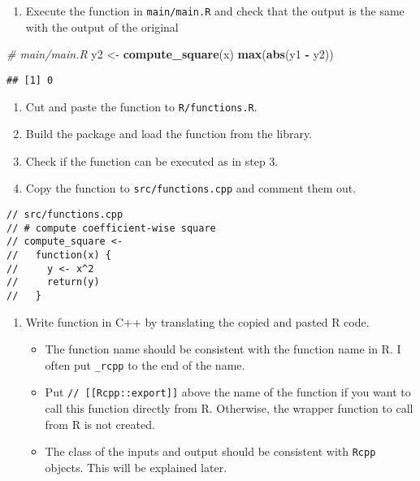\documentclass[
]{book}
\newenvironment{Shaded}{\begin{snugshade}}{\end{snugshade}}
\newcommand{\CommentTok}[1]{\textcolor[rgb]{0.56,0.35,0.01}{\textit{#1}}}
\newcommand{\KeywordTok}[1]{\textcolor[rgb]{0.13,0.29,0.53}{\textbf{#1}}}
\newcommand{\NormalTok}[1]{#1}
\newcommand{\OperatorTok}[1]{\textcolor[rgb]{0.81,0.36,0.00}{\textbf{#1}}}
\newcommand{\StringTok}[1]{\textcolor[rgb]{0.31,0.60,0.02}{#1}}
\providecommand{\tightlist}{%
  \setlength{\itemsep}{0pt}\setlength{\parskip}{0pt}}
\begin{document}
\begin{enumerate}
\def\labelenumi{\arabic{enumi}.}
\setcounter{enumi}{2}
\tightlist
\item
  Execute the function in \texttt{main/main.R} and check that the output is the same with the output of the original
\end{enumerate}

\begin{Shaded}
\begin{Highlighting}[]
\CommentTok{# main/main.R}
\NormalTok{y2 <-}\StringTok{ }\KeywordTok{compute_square}\NormalTok{(x)}
\KeywordTok{max}\NormalTok{(}\KeywordTok{abs}\NormalTok{(y1 }\OperatorTok{-}\StringTok{ }\NormalTok{y2))}
\end{Highlighting}
\end{Shaded}

\begin{verbatim}
## [1] 0
\end{verbatim}

\begin{enumerate}
\def\labelenumi{\arabic{enumi}.}
\setcounter{enumi}{3}
\tightlist
\item
  Cut and paste the function to \texttt{R/functions.R}.
\item
  Build the package and load the function from the library.
\item
  Check if the function can be executed as in step 3.
\item
  Copy the function to \texttt{src/functions.cpp} and comment them out.
\end{enumerate}

\begin{verbatim}
// src/functions.cpp
// # compute coefficient-wise square
// compute_square <-
//   function(x) {
//     y <- x^2
//     return(y)
//   }
\end{verbatim}

\begin{enumerate}
\def\labelenumi{\arabic{enumi}.}
\setcounter{enumi}{7}
\tightlist
\item
  Write function in C++ by translating the copied and pasted R code.

  \begin{itemize}
  \tightlist
  \item
    The function name should be consistent with the function name in R. I often put \texttt{\_rcpp} to the end of the name.
  \item
    Put \texttt{//\ {[}{[}Rcpp::export{]}{]}} above the name of the function if you want to call this function directly from R. Otherwise, the wrapper function to call from R is not created.
  \item
    The class of the inputs and output should be consistent with \texttt{Rcpp} objects. This will be explained later.
  \end{itemize}
\end{enumerate}
\end{document}
